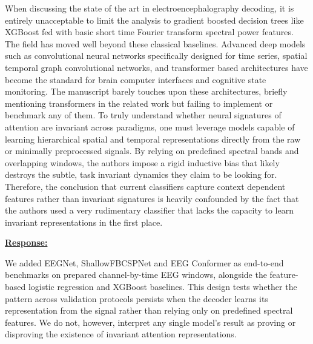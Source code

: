 \documentclass{article}
\begin{document}
\vspace{0.3cm}


\begin{cmt}{}{}

When discussing the state of the art in electroencephalography decoding, it is
entirely unacceptable to limit the analysis to gradient boosted decision trees
like XGBoost fed with basic short time Fourier transform spectral power
features. The field has moved well beyond these classical baselines. Advanced
deep models such as convolutional neural networks specifically designed for time
series, spatial temporal graph convolutional networks, and transformer based
architectures have become the standard for brain computer interfaces and
cognitive state monitoring. The manuscript barely touches upon these
architectures, briefly mentioning transformers in the related work but failing
to implement or benchmark any of them. To truly understand whether neural
signatures of attention are invariant across paradigms, one must leverage models
capable of learning hierarchical spatial and temporal representations directly
from the raw or minimally preprocessed signals. By relying on predefined
spectral bands and overlapping windows, the authors impose a rigid inductive
bias that likely destroys the subtle, task invariant dynamics they claim to be
looking for. Therefore, the conclusion that current classifiers capture context
dependent features rather than invariant signatures is heavily confounded by the
fact that the authors used a very rudimentary classifier that lacks the capacity
to learn invariant representations in the first place.

\end{cmt}
\vspace{0.1cm}
\noindent
\underline{\textbf{Response:}}
\vspace{0.2cm}

We added EEGNet, ShallowFBCSPNet and EEG Conformer as end-to-end benchmarks on
prepared channel-by-time EEG windows, alongside the feature-based logistic
regression and XGBoost baselines. This design tests whether the pattern across
validation protocols persists when the decoder learns its representation from
the signal rather than relying only on predefined spectral features. We do not,
however, interpret any single model's result as proving or disproving the
existence of invariant attention representations.

\vspace{0.3cm}
\end{document}
